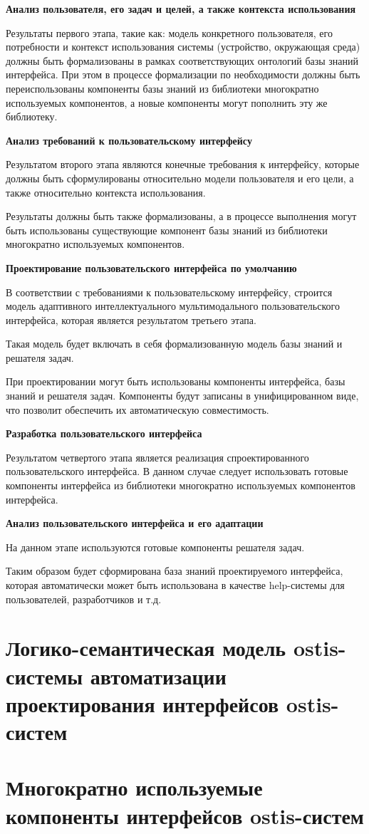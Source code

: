 \textbf{Анализ пользователя, его задач и целей, а также контекста использования}

Результаты первого этапа, такие как: модель конкретного пользователя, его потребности и контекст использования системы (устройство, окружающая среда) должны быть формализованы в рамках соответствующих онтологий базы знаний интерфейса. 
При этом в процессе формализации по необходимости должны быть переиспользованы компоненты базы знаний из библиотеки многократно используемых компонентов, а новые компоненты могут пополнить эту же библиотеку.

\textbf{Анализ требований к пользовательскому интерфейсу}

Результатом второго этапа являются конечные требования к интерфейсу, которые должны быть сформулированы относительно модели пользователя и его цели, а также относительно контекста использования.

Результаты должны быть также формализованы, а в процессе выполнения могут быть использованы существующие компонент базы знаний из библиотеки многократно используемых компонентов.

\textbf{Проектирование пользовательского интерфейса по умолчанию}

В соответствии с требованиями к пользовательскому интерфейсу, строится модель адаптивного интеллектуального мультимодального пользовательского интерфейса, которая является результатом третьего этапа.

Такая модель будет включать в себя формализованную модель базы знаний и решателя задач.

При проектировании могут быть использованы компоненты интерфейса, базы знаний и решателя задач. 
Компоненты будут записаны в унифицированном виде, что позволит обеспечить их автоматическую совместимость.

\textbf{Разработка пользовательского интерфейса}

Результатом четвертого этапа является реализация спроектированного пользовательского интерфейса. В данном случае следует использовать готовые компоненты интерфейса из библиотеки многократно используемых компонентов интерфейса.

\textbf{Анализ пользовательского интерфейса и его адаптации}

На данном этапе используются готовые компоненты решателя задач.

Таким образом будет сформирована база знаний проектируемого интерфейса, которая автоматически может быть использована в качестве help-системы для пользователей, разработчиков и т.д.



\section{Логико-семантическая модель ostis-системы автоматизации проектирования интерфейсов ostis-систем}
\section{Многократно используемые компоненты интерфейсов ostis-систем}

%